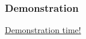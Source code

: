   \begin{frame}
    \frametitle{Demonstration}
    \centering
    \href{https://asciinema.org/a/86989}{\HUGE Demonstration time!}
  \end{frame}
